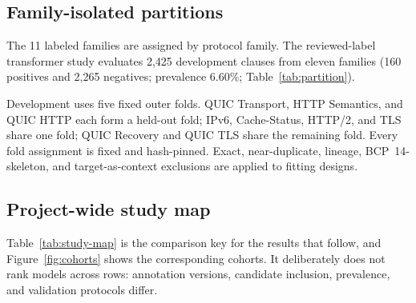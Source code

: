 \documentclass[12pt,a4paper,oneside]{report}
\begin{document}
\subsection{Family-isolated partitions}

The 11 labeled families are assigned by protocol family. The reviewed-label transformer study evaluates 2,425 development clauses from eleven families (160 positives and 2,265 negatives; prevalence 6.60\%; Table~\ref{tab:partition}).

\begin{table}[!tbp]
\caption{Development cohort evaluated in the reviewed-label transformer study.}
\label{tab:partition}
\centering
{}
\end{table}

Development uses five fixed outer folds. QUIC Transport, HTTP Semantics, and QUIC HTTP each form a held-out fold; IPv6, Cache-Status, HTTP/2, and TLS share one fold; QUIC Recovery and QUIC TLS share the remaining fold. Every fold assignment is fixed and hash-pinned. Exact, near-duplicate, lineage, BCP~14-skeleton, and target-as-context exclusions are applied to fitting designs.

\subsection{Project-wide study map}

Table~\ref{tab:study-map} is the comparison key for the results that follow, and Figure~\ref{fig:cohorts} shows the corresponding cohorts. It deliberately does not rank models across rows: annotation versions, candidate inclusion, prevalence, and validation protocols differ.
\end{document}
